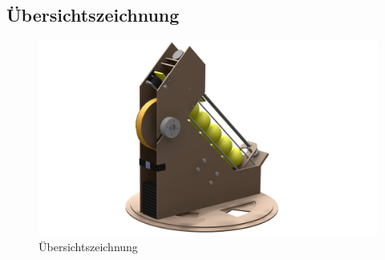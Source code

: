 \subsection{Übersichtszeichnung}
\begin{figure}[h!]
	\centering
	\includegraphics[width=\linewidth]{../../fig/Render_Komplettsystem}
	\caption{Übersichtszeichnung}
	\label{fig:Übersichtszeichnung}
\end{figure}